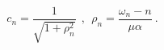 \begin{equation}
c_n = \frac{1}{\sqrt{1 + \rho_{n}^{2}}}~~,~~ \rho_{n} =
\frac{\omega_n -n}{\mu \alpha}~.
\label{cnrhon}
\end{equation}

